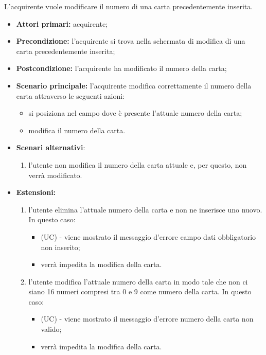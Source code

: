 L'acquirente vuole modificare il numero di una carta precedentemente inserita.
\begin{itemize}
    \item \textbf{Attori primari:} acquirente;
    \item \textbf{Precondizione:} l'acquirente si trova nella schermata di modifica di una carta precedentemente inserita;
    \item \textbf{Postcondizione:} l'acquirente ha modificato il numero della carta;
    \item \textbf{Scenario principale:} l'acquirente modifica correttamente il numero della carta attraverso le seguenti azioni:
    \begin{itemize}
        \item si posiziona nel campo dove è presente l'attuale numero della carta;
        \item modifica il numero della carta.
    \end{itemize}
    \item \textbf{Scenari alternativi}:
    \begin{enumerate}[label=\lett]
        \item l'utente non modifica il numero della carta attuale e, per questo, non verrà modificato.
    \end{enumerate}
    \item \textbf{Estensioni:}
    \begin{enumerate}[label=\lett]
        \item l'utente elimina l'attuale numero della carta e non ne inserisce uno nuovo. In questo caso:
        \begin{itemize}
            \item (UC) - viene mostrato il messaggio d'errore campo dati obbligatorio non inserito;
            \item verrà impedita la modifica della carta.
        \end{itemize}
        \item l'utente modifica l'attuale numero della carta in modo tale che non ci siano 16 numeri compresi tra 0 e 9 come numero della carta. In questo caso:
        \begin{itemize}
            \item (UC) - viene mostrato il messaggio d'errore numero della carta non valido;
            \item verrà impedita la modifica della carta.
        \end{itemize}
    \end{enumerate}
\end{itemize}

